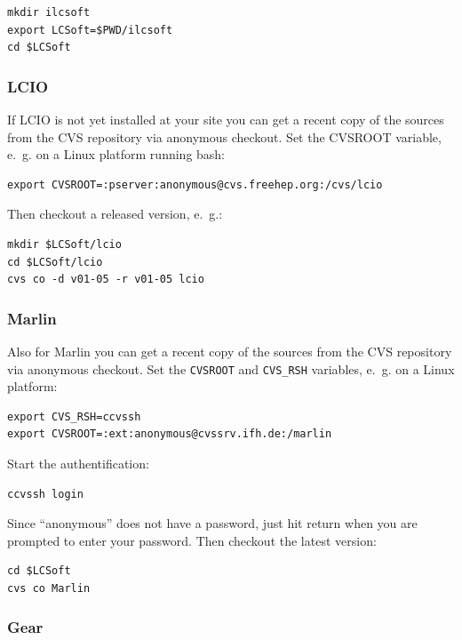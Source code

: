 \begin{verbatim}
mkdir ilcsoft 
export LCSoft=$PWD/ilcsoft
cd $LCSoft
\end{verbatim}

\subsubsection*{LCIO}

If LCIO is not yet installed at your site you can get a recent copy
of the sources from the CVS repository via anonymous checkout.
Set the CVSROOT variable, e.~g. on a Linux platform running bash:

\begin{verbatim}
export CVSROOT=:pserver:anonymous@cvs.freehep.org:/cvs/lcio
\end{verbatim}

Then checkout a released version, e.~g.:

\begin{verbatim}
mkdir $LCSoft/lcio 
cd $LCSoft/lcio 
cvs co -d v01-05 -r v01-05 lcio 
\end{verbatim}

\subsubsection*{Marlin}

Also for Marlin you can get a recent copy of the sources from the CVS 
repository via anonymous checkout.
Set the {\tt CVSROOT} and {\tt CVS\_RSH} variables, e.~g. on a Linux platform: 

\begin{verbatim}
export CVS_RSH=ccvssh 
export CVSROOT=:ext:anonymous@cvssrv.ifh.de:/marlin
\end{verbatim}

Start the authentification:

\begin{verbatim}
ccvssh login
\end{verbatim}

Since ``anonymous'' does not have a password, just hit return when you are
prompted to enter your password. Then checkout the latest version:

\begin{verbatim}
cd $LCSoft
cvs co Marlin
\end{verbatim}

\subsubsection*{Gear}

